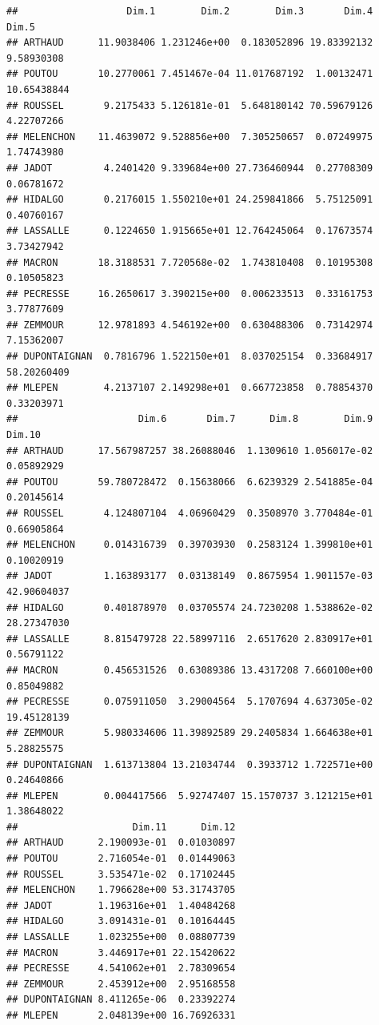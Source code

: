\documentclass[
]{book}
\begin{document}
\begin{verbatim}
##                   Dim.1        Dim.2        Dim.3       Dim.4       Dim.5
## ARTHAUD      11.9038406 1.231246e+00  0.183052896 19.83392132  9.58930308
## POUTOU       10.2770061 7.451467e-04 11.017687192  1.00132471 10.65438844
## ROUSSEL       9.2175433 5.126181e-01  5.648180142 70.59679126  4.22707266
## MELENCHON    11.4639072 9.528856e+00  7.305250657  0.07249975  1.74743980
## JADOT         4.2401420 9.339684e+00 27.736460944  0.27708309  0.06781672
## HIDALGO       0.2176015 1.550210e+01 24.259841866  5.75125091  0.40760167
## LASSALLE      0.1224650 1.915665e+01 12.764245064  0.17673574  3.73427942
## MACRON       18.3188531 7.720568e-02  1.743810408  0.10195308  0.10505823
## PECRESSE     16.2650617 3.390215e+00  0.006233513  0.33161753  3.77877609
## ZEMMOUR      12.9781893 4.546192e+00  0.630488306  0.73142974  7.15362007
## DUPONTAIGNAN  0.7816796 1.522150e+01  8.037025154  0.33684917 58.20260409
## MLEPEN        4.2137107 2.149298e+01  0.667723858  0.78854370  0.33203971
##                     Dim.6       Dim.7      Dim.8        Dim.9      Dim.10
## ARTHAUD      17.567987257 38.26088046  1.1309610 1.056017e-02  0.05892929
## POUTOU       59.780728472  0.15638066  6.6239329 2.541885e-04  0.20145614
## ROUSSEL       4.124807104  4.06960429  0.3508970 3.770484e-01  0.66905864
## MELENCHON     0.014316739  0.39703930  0.2583124 1.399810e+01  0.10020919
## JADOT         1.163893177  0.03138149  0.8675954 1.901157e-03 42.90604037
## HIDALGO       0.401878970  0.03705574 24.7230208 1.538862e-02 28.27347030
## LASSALLE      8.815479728 22.58997116  2.6517620 2.830917e+01  0.56791122
## MACRON        0.456531526  0.63089386 13.4317208 7.660100e+00  0.85049882
## PECRESSE      0.075911050  3.29004564  5.1707694 4.637305e-02 19.45128139
## ZEMMOUR       5.980334606 11.39892589 29.2405834 1.664638e+01  5.28825575
## DUPONTAIGNAN  1.613713804 13.21034744  0.3933712 1.722571e+00  0.24640866
## MLEPEN        0.004417566  5.92747407 15.1570737 3.121215e+01  1.38648022
##                    Dim.11      Dim.12
## ARTHAUD      2.190093e-01  0.01030897
## POUTOU       2.716054e-01  0.01449063
## ROUSSEL      3.535471e-02  0.17102445
## MELENCHON    1.796628e+00 53.31743705
## JADOT        1.196316e+01  1.40484268
## HIDALGO      3.091431e-01  0.10164445
## LASSALLE     1.023255e+00  0.08807739
## MACRON       3.446917e+01 22.15420622
## PECRESSE     4.541062e+01  2.78309654
## ZEMMOUR      2.453912e+00  2.95168558
## DUPONTAIGNAN 8.411265e-06  0.23392274
## MLEPEN       2.048139e+00 16.76926331
\end{verbatim}
\end{document}
